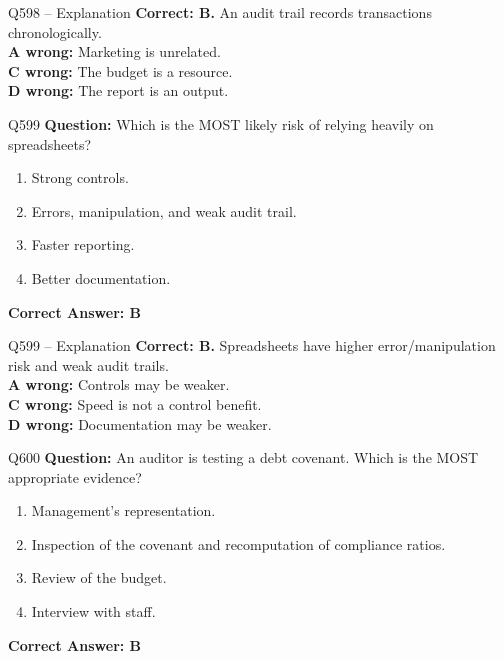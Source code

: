 \documentclass[aspectratio=169,10pt]{beamer}
\begin{document}
	\begin{frame}[t]{Q598 -- Explanation}
		\small
		\textbf{Correct: B.} An audit trail records transactions chronologically. \\[4pt]
		\textbf{A wrong:} Marketing is unrelated. \\[2pt]
		\textbf{C wrong:} The budget is a resource. \\[2pt]
		\textbf{D wrong:} The report is an output.
	\end{frame}
	
	\begin{frame}[t]{Q599}
		\small
		\textbf{Question:} Which is the MOST likely risk of relying heavily on spreadsheets?
		\begin{enumerate}[label=\Alph*.,itemsep=1pt,topsep=2pt]
			\item Strong controls.
			\item Errors, manipulation, and weak audit trail.
			\item Faster reporting.
			\item Better documentation.
		\end{enumerate}
		\vspace{4pt}
		\textbf{Correct Answer: B}
	\end{frame}
	
	\begin{frame}[t]{Q599 -- Explanation}
		\small
		\textbf{Correct: B.} Spreadsheets have higher error/manipulation risk and weak audit trails. \\[4pt]
		\textbf{A wrong:} Controls may be weaker. \\[2pt]
		\textbf{C wrong:} Speed is not a control benefit. \\[2pt]
		\textbf{D wrong:} Documentation may be weaker.
	\end{frame}
	
	\begin{frame}[t]{Q600}
		\small
		\textbf{Question:} An auditor is testing a debt covenant. Which is the MOST appropriate evidence?
		\begin{enumerate}[label=\Alph*.,itemsep=1pt,topsep=2pt]
			\item Management's representation.
			\item Inspection of the covenant and recomputation of compliance ratios.
			\item Review of the budget.
			\item Interview with staff.
		\end{enumerate}
		\vspace{4pt}
		\textbf{Correct Answer: B}
	\end{frame}
	
\end{document}
